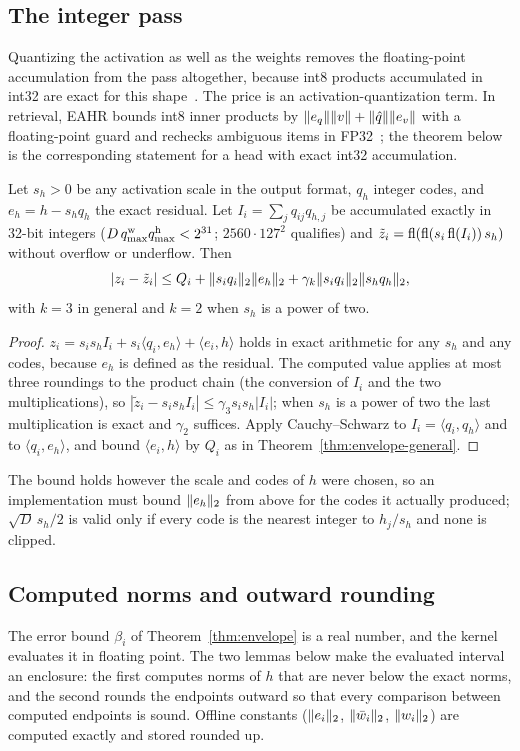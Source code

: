\subsection{The integer pass}\label{app:integer}
Quantizing the activation as well as the weights removes the floating-point accumulation from the pass altogether, because int8 products accumulated in int32 are exact for this shape~\cite{abdelfattah2025}. The price is an activation-quantization term. In retrieval, EAHR bounds int8 inner products by $\lVert e_q\rVert\lVert v\rVert+\lVert \hat q\rVert\lVert e_v\rVert$ with a floating-point guard and rechecks ambiguous items in FP32~\cite{eahr}; the theorem below is the corresponding statement for a head with exact int32 accumulation.
\begin{theorem}\label{thm:integer}
Let $s_h>0$ be any activation scale in the output format, $q_h$ integer codes, and $e_h=h-s_hq_h$ the exact residual. Let $I_i=\sum_jq_{ij}q_{h,j}$ be accumulated exactly in 32-bit integers ($D\,q^{\rm w}_{\max}q^{\rm h}_{\max}<2^{31}$; $2560\cdot127^2$ qualifies) and $\tilde z_i=\operatorname{fl}(\operatorname{fl}(s_i\operatorname{fl}(I_i))\,s_h)$ without overflow or underflow. Then
\[|z_i-\tilde z_i|\le Q_i+\lVert s_iq_i\rVert_2\lVert e_h\rVert_2+\gamma_k\lVert s_iq_i\rVert_2\lVert s_hq_h\rVert_2,\]
with $k=3$ in general and $k=2$ when $s_h$ is a power of two.
\end{theorem}
\begin{proof}
$z_i=s_is_hI_i+s_i\langle q_i,e_h\rangle+\langle e_i,h\rangle$ holds in exact arithmetic for any $s_h$ and any codes, because $e_h$ is defined as the residual. The computed value applies at most three roundings to the product chain (the conversion of $I_i$ and the two multiplications), so $|\tilde z_i-s_is_hI_i|\le\gamma_3s_is_h|I_i|$; when $s_h$ is a power of two the last multiplication is exact and $\gamma_2$ suffices. Apply Cauchy--Schwarz to $I_i=\langle q_i,q_h\rangle$ and to $\langle q_i,e_h\rangle$, and bound $\langle e_i,h\rangle$ by $Q_i$ as in Theorem~\ref{thm:envelope-general}.
\end{proof}
The bound holds however the scale and codes of $h$ were chosen, so an implementation must bound $\lVert e_h\rVert_2$ from above for the codes it actually produced; $\sqrt D\,s_h/2$ is valid only if every code is the nearest integer to $h_j/s_h$ and none is clipped.

\subsection{Computed norms and outward rounding}\label{app:outward}
The error bound $\beta_i$ of Theorem~\ref{thm:envelope} is a real number, and the kernel evaluates it in floating point. The two lemmas below make the evaluated interval an enclosure: the first computes norms of $h$ that are never below the exact norms, and the second rounds the endpoints outward so that every comparison between computed endpoints is sound. Offline constants ($\lVert e_i\rVert_2$, $\lVert \bar w_i\rVert_2$, $\lVert w_i\rVert_2$) are computed exactly and stored rounded up.

